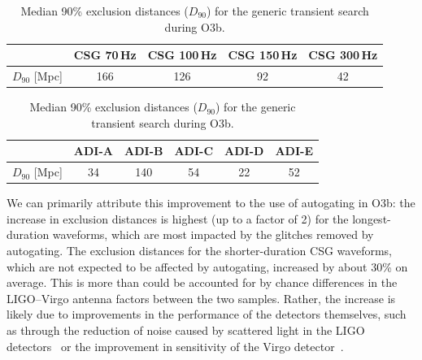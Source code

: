 \begin{table}[h]
  \hspace{0.5cm}
  \caption
  {\label{tab:grb-o3b-x-exclusion} Median 90\% exclusion distances ($D_{90}$) for the generic transient search during O3b.}
  \begin{tabular}{c c c c c}
    \hline
    \hline
    \rule{0pt}{4ex}
    & CSG 70\,Hz & CSG 100\,Hz & CSG 150\,Hz & CSG 300\,Hz \\
    \hline
    \rule[-2ex]{0pt}{4ex}
    $D_{90}$ [Mpc] & 166 & 126 & 92 & 42
  \end{tabular}
  \begin{tabular}{c c c c c c}
    \hline
    \hline
    \rule{0pt}{4ex}
    & ADI-A & ADI-B & ADI-C & ADI-D & ADI-E \\
    \hline
    \rule[-2ex]{0pt}{4ex}
    $D_{90}$ [Mpc] & 34 & 140 & 54 & 22 & 52 \\
    \hline
  \end{tabular}
\end{table}

We can primarily attribute this improvement to the use of autogating in O3b: the increase in exclusion distances is highest (up to a factor of 2) for the longest-duration waveforms, which are most impacted by the glitches removed by autogating.
The exclusion distances for the shorter-duration CSG waveforms, which are not expected to be affected by autogating, increased by about 30\% on average.
This is more than could be accounted for by chance differences in the LIGO–Virgo antenna factors between the two samples.
Rather, the increase is likely due to improvements in the performance of the detectors themselves, such as through the reduction of noise caused by scattered light in the LIGO detectors~\cite{Soni_2020} or the improvement in sensitivity of the Virgo detector~\cite{Davis_2021}.


